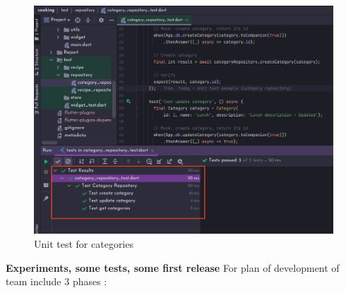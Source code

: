 \documentclass{article}
\begin{document}
            \begin{figure}[h!]
            \centering
            \includegraphics[scale=0.3]{Images/image (1).png}
            \caption{Unit test for categories}
            \label{fig:cookingbook}
            \end{figure}
            \textbf{Experiments, some tests, some first release} 
    For plan of development of team include 3 phases :   
\end{document}
